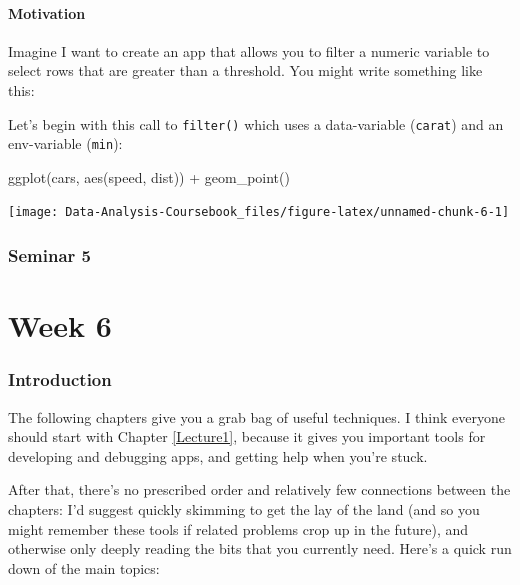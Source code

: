 \documentclass[
]{article}
\newenvironment{Shaded}{\begin{snugshade}}{\end{snugshade}}
\newcommand{\FunctionTok}[1]{\textcolor[rgb]{0.00,0.00,0.00}{#1}}
\newcommand{\NormalTok}[1]{#1}
\newcommand{\SpecialCharTok}[1]{\textcolor[rgb]{0.00,0.00,0.00}{#1}}
\begin{document}
\hypertarget{tidy-motivation}{%
\subsection{Motivation}\label{tidy-motivation}}

Imagine I want to create an app that allows you to filter a numeric variable to select rows that are greater than a threshold.
You might write something like this:

Let's begin with this call to \texttt{filter()} which uses a data-variable (\texttt{carat}) and an env-variable (\texttt{min}):

\begin{Shaded}
\begin{Highlighting}[]
\FunctionTok{ggplot}\NormalTok{(cars, }\FunctionTok{aes}\NormalTok{(speed, dist)) }\SpecialCharTok{+} 
  \FunctionTok{geom\_point}\NormalTok{()}
\end{Highlighting}
\end{Shaded}

\begin{center}\texttt{[image: Data-Analysis-Coursebook\_files/figure-latex/unnamed-chunk-6-1]} \end{center}

\hypertarget{seminar5}{%
\section{Seminar 5}\label{seminar5}}

\hypertarget{part-week-6}{%
\part*{Week 6}\label{part-week-6}}

\hypertarget{week6-intro}{%
\section*{Introduction}\label{week6-intro}}

The following chapters give you a grab bag of useful techniques.
I think everyone should start with Chapter \ref{Lecture1}, because it gives you important tools for developing and debugging apps, and getting help when you're stuck.

After that, there's no prescribed order and relatively few connections between the chapters: I'd suggest quickly skimming to get the lay of the land (and so you might remember these tools if related problems crop up in the future), and otherwise only deeply reading the bits that you currently need.
Here's a quick run down of the main topics:
\end{document}
